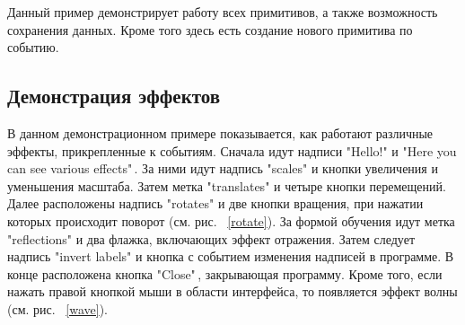 \documentclass[14pt]{extarticle}
\begin{document}
		\pagebreak
	Данный пример демонстрирует работу всех примитивов, а также возможность сохранения данных. Кроме того здесь есть создание нового примитива по событию.  
	
	\subsection{Демонстрация эффектов}
	
	В данном демонстрационном примере показывается, как работают различные эффекты, прикрепленные к событиям. 
	Сначала идут надписи "Hello!"\,\,и "Here you can see various effects"\,.
	За ними идут надпись "scales"\,\,и кнопки увеличения и уменьшения масштаба.
	Затем метка "translates"\,\,и четыре кнопки перемещений. 
	Далее расположены надпись "rotates"\,\,и две кнопки вращения, при нажатии которых происходит поворот (см. рис. ~\ref{rotate}).
	За формой обучения идут метка "reflections"\,\,и два флажка, включающих эффект отражения.
	Затем  следует надпись "invert labels"\,\,и кнопка с событием изменения надписей в программе.
	В конце расположена кнопка "Close"\,, закрывающая программу. 
	Кроме того, если нажать правой кнопкой мыши в области интерфейса, то появляется эффект волны (см. рис. ~\ref{wave}). 
	
\end{document}
